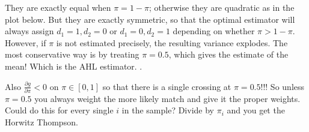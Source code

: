 \documentclass[11pt]{amsart}
\begin{document}
They are exactly equal when $\pi = 1-\pi$; otherwise they are quadratic as in the plot below.   But they are exactly symmetric, so that the optimal estimator will always assign $d_1 = 1, d_2= 0$ or $d_1=0, d_2=1$ depending on whether $\pi > 1-\pi$.  However, if $\pi$ is not estimated precisely, the resulting variance explodes.  The most conservative way is by treating $\pi = 0.5$, which gives the estimate of the mean!  Which is the AHL estimator. .

Also $\frac{\partial g}{\partial \pi} < 0$ on $\pi \in [0,1]$ so that there is a single crossing at $\pi=0.5$!!! So unless $\pi = 0.5$ you always weight the more likely match and give it the proper weights.  Could do this for every single $i$ in the sample?  Divide by $\pi_i$ and you get the Horwitz Thompson.    
\end{document}

